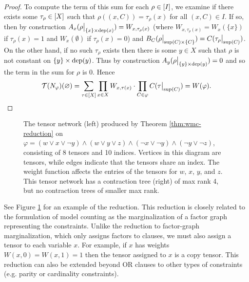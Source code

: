 \begin{proof}
To compute the term of this sum for each $\rho \in [I]$, we examine if there exists some $\tau_\rho \in [X]$ such that $\rho((x, C)) = \tau_\rho(x)$ for all $(x, C) \in I$. If so, then by construction $A_x(\rho\big|_{\{x\} \times \text{dep}(x)}) = W_{x, \tau_\rho(x)}$ (where $W_{x, \tau_\rho(x)} = W_x(\{x\})$ if $\tau_\rho(x)=1$ and $W_x(\emptyset)$ if $\tau_\rho(x)=0$) and $B_C(\rho\big|_{\text{sup}(C) \times \{C\}}) = C(\tau_\rho\big|_{\text{sup}(C)})$. On the other hand, if no such $\tau_\rho$ exists then there is some $y \in X$ such that $\rho$ is not constant on $\{y\} \times \text{dep}(y)$. Thus by construction $A_y(\rho\big|_{\{y\} \times \text{dep}(y)}) = 0$ and so the term in the sum for $\rho$ is 0. Hence
$$\mathcal{T}(N_\varphi)(\varnothing) = \sum_{\tau \in [X]} \prod_{x \in X} W_{x, \tau(x)} \cdot \prod_{C \in \varphi} C(\tau\big|_{\text{sup}(C)}) = W(\varphi).$$
\end{proof}

\begin{figure}[t]
	\centering
	
	\hspace{1cm}
	
	\caption{\label{fig:wmc-example} The tensor network (left) produced by Theorem \ref{thm:wmc-reduction} on $\varphi = (w \lor x \lor \neg y) \land (w \lor y \lor z) \land (\neg x \lor \neg y) \land (\neg y \lor \neg z)$, consisting of 8 tensors and 10 indices. Vertices in this diagram are tensors, while edges indicate that the tensors share an index. The weight function affects the entries of the tensors for $w$, $x$, $y$, and $z$. This tensor network has a contraction tree (right) of max rank 4, but no contraction trees of smaller max rank.}
\end{figure}

See Figure \ref{fig:wmc-example} for an example of the reduction. This reduction is closely related to the formulation of model counting as the marginalization of a factor graph representing the constraints. Unlike the reduction to factor-graph marginalization, which only assigns factors to clauses, we must also assign a tensor to each variable $x$. For example, if $x$ has weights $W(x, 0) = W(x,1) = 1$ then the tensor assigned to $x$ is a copy tensor. This reduction can also be extended beyond OR clauses to other types of constraints (e.g. parity or cardinality constraints). 




